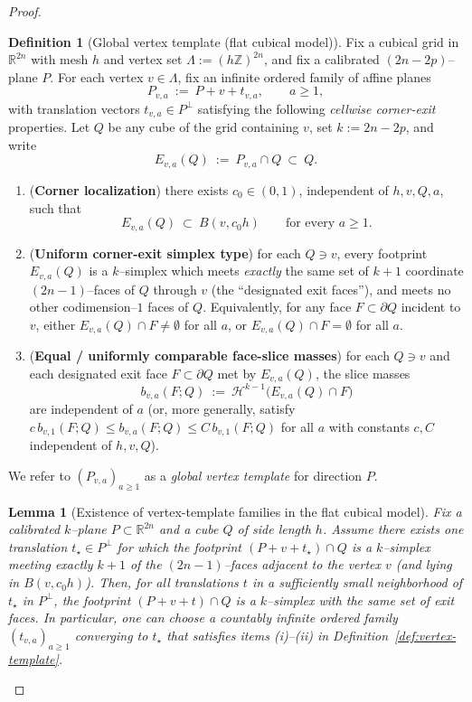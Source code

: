 \documentclass[11pt]{article}
\numberwithin{equation}{section}  %
\theoremstyle{plain}
\newtheorem{lemma}[theorem]{Lemma}
\theoremstyle{definition}
\newtheorem{definition}[theorem]{Definition}
\theoremstyle{remark}
\newcommand{\R}{\mathbb{R}}
\newcommand{\Z}{\mathbb{Z}}
\begin{document}
\begin{proof}
\begin{definition}[Global vertex template (flat cubical model)]
Fix a cubical grid in $\R^{2n}$ with mesh $h$ and vertex set $\Lambda:=(h\Z)^{2n}$, and fix a calibrated $(2n-2p)$--plane $P$.
For each vertex $v\in\Lambda$, fix an infinite ordered family of affine planes
\[
P_{v,a}\ :=\ P+v+t_{v,a},\qquad a\ge 1,
\]
with translation vectors $t_{v,a}\in P^\perp$ satisfying the following \emph{cellwise corner-exit} properties.
Let $Q$ be any cube of the grid containing $v$, set $k:=2n-2p$, and write
\[
E_{v,a}(Q)\ :=\ P_{v,a}\cap Q\ \subset\ Q.
\]
\begin{enumerate}
\item[\textnormal{(i)}] (\textbf{Corner localization}) there exists $c_0\in(0,1)$, independent of $h,v,Q,a$, such that
\[
E_{v,a}(Q)\ \subset\ B(v,c_0h)
\qquad\text{for every }a\ge 1.
\]
\item[\textnormal{(ii)}] (\textbf{Uniform corner-exit simplex type}) for each $Q\ni v$, every footprint $E_{v,a}(Q)$ is a $k$--simplex
which meets \emph{exactly} the same set of $k\!+\!1$ coordinate $(2n\!-\!1)$--faces of $Q$ through $v$ (the ``designated exit faces''),
and meets no other codimension--$1$ faces of $Q$.
Equivalently, for any face $F\subset\partial Q$ incident to $v$, either $E_{v,a}(Q)\cap F\neq\emptyset$ for all $a$,
or $E_{v,a}(Q)\cap F=\emptyset$ for all $a$.
\item[\textnormal{(iii)}] (\textbf{Equal / uniformly comparable face-slice masses}) for each $Q\ni v$ and each designated exit face $F\subset\partial Q$
met by $E_{v,a}(Q)$, the slice masses
\[
b_{v,a}(F;Q)\ :=\ \mathcal H^{k-1}\bigl(E_{v,a}(Q)\cap F\bigr)
\]
are independent of $a$ (or, more generally, satisfy
$c\,b_{v,1}(F;Q)\le b_{v,a}(F;Q)\le C\,b_{v,1}(F;Q)$ for all $a$ with constants $c,C$ independent of $h,v,Q$).
\end{enumerate}
We refer to $(P_{v,a})_{a\ge 1}$ as a \emph{global vertex template} for direction $P$.

\end{definition}

\begin{lemma}[Existence of vertex-template families in the flat cubical model]\label{lem:vertex-template-exists}
Fix a calibrated $k$--plane $P\subset\R^{2n}$ and a cube $Q$ of side length $h$.
Assume there exists \emph{one} translation $t_\star\in P^\perp$ for which the footprint $(P+v+t_\star)\cap Q$
is a $k$--simplex meeting exactly $k\!+\!1$ of the $(2n\!-\!1)$--faces adjacent to the vertex $v$
(and lying in $B(v,c_0h)$). Then, for all translations $t$ in a sufficiently small neighborhood of $t_\star$ in $P^\perp$,
the footprint $(P+v+t)\cap Q$ is a $k$--simplex with the same set of exit faces.
In particular, one can choose a countably infinite ordered family $(t_{v,a})_{a\ge 1}$ converging to $t_\star$
that satisfies items (i)--(ii) in Definition~\ref{def:vertex-template}.
\end{lemma}


\end{proof}
\end{document}
